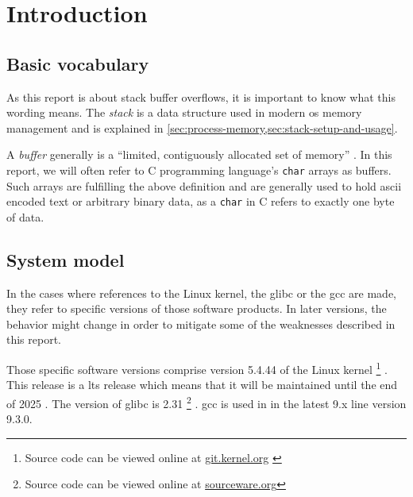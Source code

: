 \chapter{Introduction}
\label{chp:introduction}


\section{Basic vocabulary}
\label{sec:basic-vocabulary}
As this report is about stack buffer overflows, it is important to know what this wording means.
The \emph{stack} is a data structure used in modern \gls{os} memory management and is explained in \cref{sec:process-memory,sec:stack-setup-and-usage}.

A \emph{buffer} generally is a ``limited, contiguously allocated set of memory'' \cite[12]{Anley2007}.
In this report, we will often refer to C programming language's \texttt{char} arrays as buffers.
Such arrays are fulfilling the above definition and are generally used to hold \gls{ascii} encoded text or arbitrary binary data, as a \texttt{char} in C refers to exactly one byte of data.

\section{System model}
\label{sec:system-model}

In the cases where references to the Linux kernel, the \gls{glibc} or the \gls{gcc} are made, they refer to specific versions of those software products.
In later versions, the behavior might change in order to mitigate some of the weaknesses described in this report.

Those specific software versions comprise version 5.4.44 of the Linux kernel%
	\footnote{Source code can be viewed online at \href{https://git.kernel.org/stable/h/v5.4.44}{git.kernel.org} \cite{LKD2020}}%
.
This release is a \gls{lts} release which means that it will be maintained until the end of 2025 \cite{LKO2020}.
The version of \gls{glibc} is 2.31%
	\footnote{Source code can be viewed online at \href{https://sourceware.org/git/?p=glibc.git;a=tree;h=6ee690ef6fa36bf79d2e05b5a30a4f7e10ba3937;hb=9ea3686266dca3f004ba874745a4087a89682617}{sourceware.org}}%
.
\gls{gcc} is used in in the latest 9.x line version 9.3.0.

